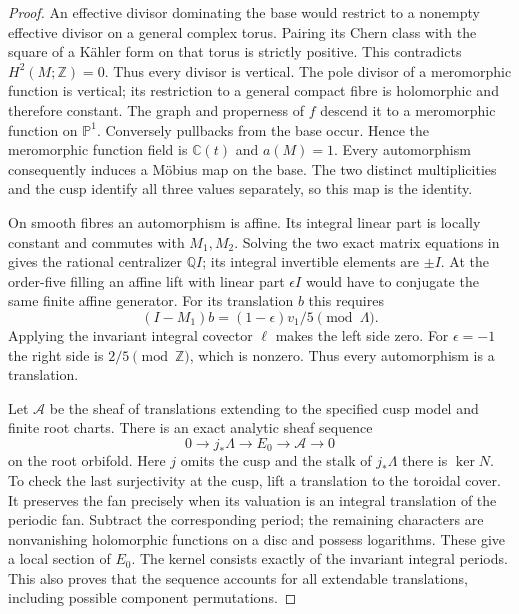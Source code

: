 \begin{proof}
An effective divisor dominating the base would restrict to
a nonempty effective divisor on a general complex torus.
Pairing its Chern class with the square of a Kähler form
on that torus is strictly positive. This contradicts
$H^2(M;\mathbb Z)=0$. Thus every divisor is vertical.
The pole divisor of a meromorphic function is vertical;
its restriction to a general compact fibre is holomorphic
and therefore constant. The graph and properness of $f$
descend it to a meromorphic function on $\mathbb P^1$.
Conversely pullbacks from the base occur. Hence the
meromorphic function field is $\mathbb C(t)$ and $a(M)=1$.
Every automorphism consequently induces a Möbius map on
the base. The two distinct multiplicities and the cusp
identify all three values separately, so this map is the
identity.

On smooth fibres an automorphism is affine. Its integral
linear part is locally constant and commutes with $M_1,M_2$.
Solving the two exact matrix equations in
 gives the rational
centralizer $\mathbb Q I$; its integral invertible elements
are $\pm I$. At the order-five filling an affine lift with
linear part $\epsilon I$ would have to conjugate the same
finite affine generator. For its translation $b$ this
requires
\[
(I-M_1)b=(1-\epsilon)v_1/5\pmod\Lambda.
\]
Applying the invariant integral covector $\ell$ makes the
left side zero. For $\epsilon=-1$ the right side is
$2/5\pmod\mathbb Z$, which is nonzero. Thus every
automorphism is a translation.

Let $\mathcal A$ be the sheaf of translations extending to
the specified cusp model and finite root charts. There is
an exact analytic sheaf sequence
\[
0\to j_*\Lambda\to E_0\to\mathcal A\to0
\]
on the root orbifold. Here $j$ omits the cusp and the stalk
of $j_*\Lambda$ there is $\ker N$.
To check the last surjectivity at the cusp, lift a translation
to the toroidal cover. It preserves the fan precisely when
its valuation is an integral translation of the periodic
fan. Subtract the corresponding period; the remaining
characters are nonvanishing holomorphic functions on a
disc and possess logarithms. These give a local section
of $E_0$. The kernel consists exactly of the invariant
integral periods. This also proves that the sequence
accounts for all extendable translations, including
possible component permutations.


\end{proof}

